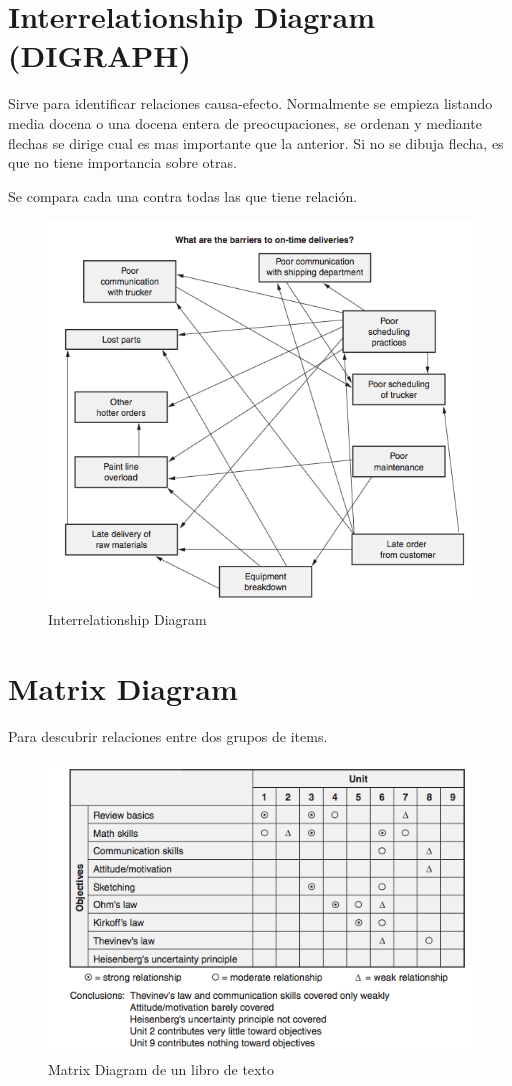 \documentclass[oneside]{book}
\begin{document}
\section{Interrelationship Diagram (DIGRAPH)}

Sirve para identificar relaciones causa-efecto. Normalmente se empieza listando media docena o una docena entera de preocupaciones, se ordenan y mediante flechas se dirige cual es mas importante que la anterior. Si no se dibuja flecha, es que no tiene importancia sobre otras.

Se compara cada una contra todas las que tiene relación. 

\begin{figure}[H]
	\centering
	\includegraphics[width=120mm]{imagenes/interrelationshipdiagram.png}
	\caption{Interrelationship Diagram}
	\label{fig:interrelationshipdiagram}
\end{figure}

\section{Matrix Diagram}

Para descubrir relaciones entre dos grupos de items. 

\begin{figure}[ht!]
	\centering
	\includegraphics[width=120mm]{imagenes/MatrixDiagram.png}
	\caption{Matrix Diagram de un libro de texto}
	\label{fig:MatrixDiagram}
\end{figure}
\end{document}

